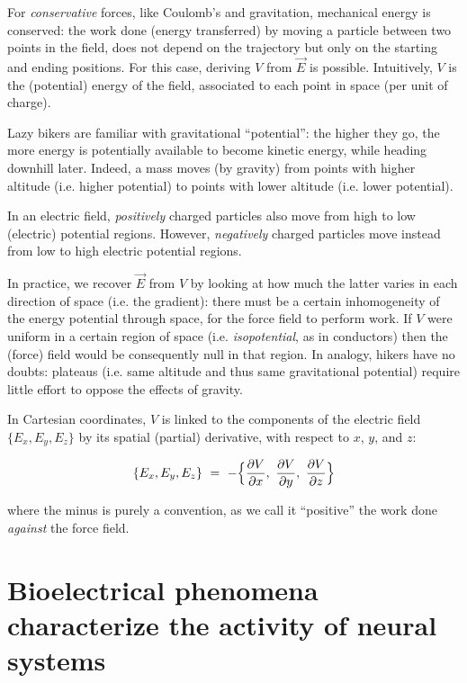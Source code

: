 For \textit{conservative} forces, like Coulomb's and gravitation, mechanical energy is conserved: the work done (energy transferred) by moving a particle between two points in the field, does not depend on the trajectory but only on the starting and ending positions. For this case, deriving \(V\) from $\vec{E}$ is possible. Intuitively, \(V\) is the (potential) energy of the field, associated to each point in space (per unit of charge). 

Lazy bikers are familiar with gravitational ``potential'': the higher they go, the more energy is potentially available to become kinetic energy, while heading downhill later. Indeed, a mass moves (by gravity) from points with higher altitude (i.e. higher potential) to points with lower altitude (i.e. lower potential). 

In an electric field, \textit{positively} charged particles also move from high to low (electric) potential regions. However, \textit{negatively} charged particles move instead from low to high electric potential regions. 

In practice, we recover $\vec{E}$ from \(V\) by looking at how much the latter varies in each direction of space (i.e. the gradient): there must be a certain inhomogeneity of the energy potential through space, for the force field to perform work. If \(V\) were uniform in a certain region of space (i.e. \textit{isopotential}, as in conductors) then the (force) field would be consequently null in that region. In analogy, hikers have no doubts: plateaus (i.e. same altitude and thus same gravitational potential) require little effort to oppose the effects of gravity. 

In Cartesian coordinates, \(V\) is linked to the components of the electric field $\{E_x, E_y, E_z\}$ by its spatial (partial) derivative, with respect to \(x\), \(y\), and \(z\): 

$$\{E_x, E_y, E_z\}\ =\ -\Bigl\{\frac{\partial V}{\partial{x}},\ \frac{\partial V}{\partial{y}},\ \frac{\partial V}{\partial{z}}\Bigr\}$$ 

where the minus is purely a convention, as we call it ``positive'' the work done \textit{against} the force field.
	





\section{Bioelectrical phenomena characterize the activity of neural systems}
